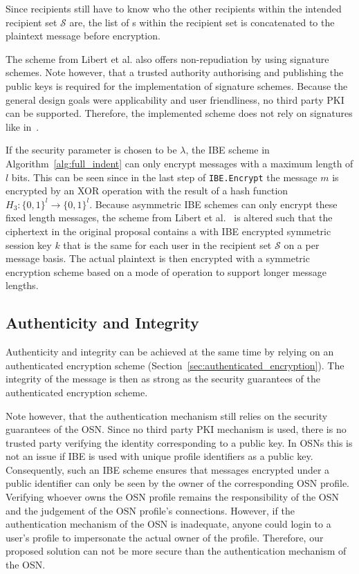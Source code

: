 Since recipients still have to know who the other recipients within the intended recipient set $\mathcal{S}$ are, the list of \id{}s within the recipient set is concatenated to the plaintext message before encryption.

The scheme from Libert et al. also offers non-repudiation by using signature schemes. Note however, that a trusted authority authorising and publishing the public keys is required for the implementation of signature schemes. Because the general design goals were applicability and user friendliness, no third party PKI can be supported. Therefore, the implemented scheme does not rely on signatures like in~\cite{art:LibertPQ12}.

If the security parameter is chosen to be $\lambda$, the IBE scheme in Algorithm~\ref{alg:full_indent} can only encrypt messages with a maximum length of $l$ bits. This can be seen since in the last step of \texttt{IBE.Encrypt} the message $m$ is encrypted by an XOR operation with the result of a hash function $H_3: \{ 0,1 \}^l \rightarrow \{ 0,1 \}^l$. Because asymmetric IBE schemes can only encrypt these fixed length messages, the scheme from Libert et al.~\cite{art:LibertPQ12} is altered such that the ciphertext in the original proposal contains a with IBE encrypted symmetric session key $k$ that is the same for each user in the recipient set $\mathcal{S}$ on a per message basis. The actual plaintext is then encrypted with a symmetric encryption scheme based on a mode of operation to support longer message lengths.

\subsection{Authenticity and Integrity}
\label{sec:authenticity_and_integrity}
Authenticity and integrity can be achieved at the same time by relying on an authenticated encryption scheme (Section~\ref{sec:authenticated_encryption}). The integrity of the message is then as strong as the security guarantees of the authenticated encryption scheme. 

Note however, that the authentication mechanism still relies on the security guarantees of the OSN. Since no third party PKI mechanism is used, there is no trusted party verifying the identity corresponding to a public key. In OSNs this is not an issue if IBE is used with unique profile identifiers as a public key. Consequently, such an IBE scheme ensures that messages encrypted under a public identifier can only be seen by the owner of the corresponding OSN profile. Verifying whoever owns the OSN profile remains the responsibility of the OSN and the judgement of the OSN profile's connections. However, if the authentication mechanism of the OSN is inadequate, anyone could login to a user's profile to impersonate the actual owner of the profile. Therefore, our proposed solution can not be more secure than the authentication mechanism of the OSN.

